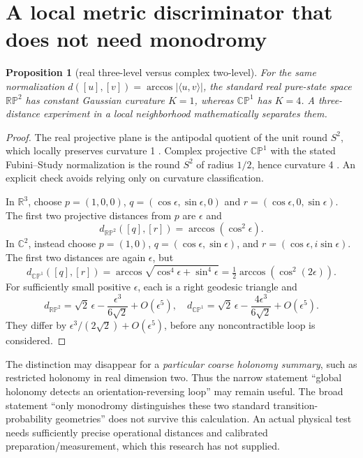 \documentclass[11pt,a4paper]{article}
\newtheorem{proposition}[theorem]{Proposition}
\newcommand{\CP}{\mathbb{CP}}
\newcommand{\RP}{\mathbb{RP}}
\begin{document}
\section{A local metric discriminator that does not need monodromy}
\begin{proposition}[real three-level versus complex two-level]\label{prop:curv}
For the same normalization \(d([u],[v])=\arccos|\langle u,v\rangle|\), the standard real pure-state space \(\RP^2\) has constant Gaussian curvature \(K=1\), whereas \(\CP^1\) has \(K=4\). A three-distance experiment in a local neighborhood mathematically separates them.
\end{proposition}
\begin{proof}
The real projective plane is the antipodal quotient of the unit round \(S^2\), which locally preserves curvature 1 \cite{katz}. Complex projective \(\CP^1\) with the stated Fubini--Study normalization is the round \(S^2\) of radius \(1/2\), hence curvature 4 \cite{bengtsson}. An explicit check avoids relying only on curvature classification.

In \(\mathbb R^3\), choose \(p=(1,0,0)\), \(q=(\cos\epsilon,\sin\epsilon,0)\) and \(r=(\cos\epsilon,0,\sin\epsilon)\). The first two projective distances from \(p\) are \(\epsilon\) and
\[
 d_{\RP^2}([q],[r])=\arccos(\cos^2\epsilon).
\]
In \(\mathbb C^2\), instead choose \(p=(1,0)\), \(q=(\cos\epsilon,\sin\epsilon)\), and \(r=(\cos\epsilon,i\sin\epsilon)\). The first two distances are again \(\epsilon\), but
\[
 d_{\CP^1}([q],[r])=\arccos\sqrt{\cos^4\epsilon+\sin^4\epsilon}
 =\tfrac12\arccos(\cos^2(2\epsilon)).
\]
For sufficiently small positive \(\epsilon\), each is a right geodesic triangle and
\[
 d_{\RP^2}=\sqrt2\,\epsilon-\frac{\epsilon^3}{6\sqrt2}+O(\epsilon^5),\quad
 d_{\CP^1}=\sqrt2\,\epsilon-\frac{4\epsilon^3}{6\sqrt2}+O(\epsilon^5).
\]
They differ by \(\epsilon^3/(2\sqrt2)+O(\epsilon^5)\), before any noncontractible loop is considered.
\end{proof}

The distinction may disappear for a \emph{particular coarse holonomy summary}, such as restricted holonomy in real dimension two. Thus the narrow statement ``global holonomy detects an orientation-reversing loop'' may remain useful. The broad statement ``only monodromy distinguishes these two standard transition-probability geometries'' does not survive this calculation. An actual physical test needs sufficiently precise operational distances and calibrated preparation/measurement, which this research has not supplied.
\end{document}
